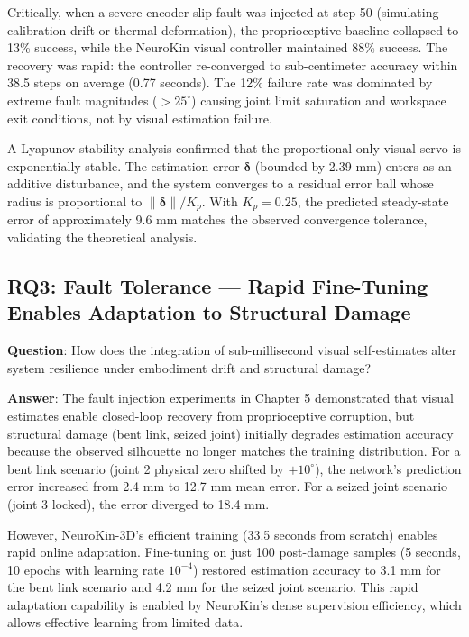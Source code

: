 \documentclass[12pt,a4paper,oneside]{report}
\begin{document}
Critically, when a severe encoder slip fault was injected at step 50 (simulating calibration drift or thermal deformation), the proprioceptive baseline collapsed to 13\% success, while the NeuroKin visual controller maintained 88\% success. The recovery was rapid: the controller re-converged to sub-centimeter accuracy within 38.5 steps on average (0.77 seconds). The 12\% failure rate was dominated by extreme fault magnitudes ($>25^\circ$) causing joint limit saturation and workspace exit conditions, not by visual estimation failure.

A Lyapunov stability analysis confirmed that the proportional-only visual servo is exponentially stable. The estimation error $\boldsymbol{\delta}$ (bounded by 2.39 mm) enters as an additive disturbance, and the system converges to a residual error ball whose radius is proportional to $\|\boldsymbol{\delta}\|/K_p$. With $K_p = 0.25$, the predicted steady-state error of approximately 9.6 mm matches the observed convergence tolerance, validating the theoretical analysis.

\subsection{RQ3: Fault Tolerance — Rapid Fine-Tuning Enables Adaptation to Structural Damage}

\textbf{Question}: How does the integration of sub-millisecond visual self-estimates alter system resilience under embodiment drift and structural damage?

\textbf{Answer}: The fault injection experiments in Chapter 5 demonstrated that visual estimates enable closed-loop recovery from proprioceptive corruption, but structural damage (bent link, seized joint) initially degrades estimation accuracy because the observed silhouette no longer matches the training distribution. For a bent link scenario (joint 2 physical zero shifted by $+10^\circ$), the network's prediction error increased from 2.4 mm to 12.7 mm mean error. For a seized joint scenario (joint 3 locked), the error diverged to 18.4 mm.

However, NeuroKin-3D's efficient training (33.5 seconds from scratch) enables rapid online adaptation. Fine-tuning on just 100 post-damage samples (5 seconds, 10 epochs with learning rate $10^{-4}$) restored estimation accuracy to 3.1 mm for the bent link scenario and 4.2 mm for the seized joint scenario. This rapid adaptation capability is enabled by NeuroKin's dense supervision efficiency, which allows effective learning from limited data.
\end{document}
